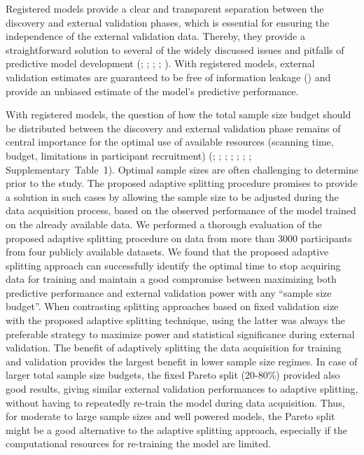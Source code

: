 \documentclass{article}
\begin{document}
Registered models provide a clear and transparent separation between the discovery and external validation phases, which is essential for ensuring the independence of the external validation data. Thereby, they provide a straightforward solution to several of the widely discussed issues and pitfalls of predictive model development (\cite{Efron_1983}; \cite{Sui_2020}; \cite{Varoquaux_2022}; \cite{Marek_2022}; \cite{Spisak_2023}). With registered models, external validation estimates are guaranteed to be free of information leakage (\cite{Kapoor_2023}) and provide an unbiased estimate of the model's predictive performance.

With registered models, the question of how the total sample size budget should be distributed between the discovery and external validation phase remains of central importance for the optimal use of available resources (scanning time, budget, limitations in participant recruitment) (\cite{Archer_2020}; \cite{Riley_2021}; \cite{Marek_2022}; \cite{Spisak_2023}; \cite{Rosenberg_2022}; \cite{Thirion_2023}; \cite{Makowski_2023}; Supplementary~Table~1). Optimal sample sizes are often challenging to determine prior to the study. The proposed adaptive splitting procedure promises to provide a solution in such cases by allowing the sample size to be adjusted during the data acquisition process, based on the observed performance of the model trained on the already available data.
We performed a thorough evaluation of the proposed adaptive splitting procedure on data from more than 3000 participants from four publicly available datasets. We found that the proposed adaptive splitting approach can successfully identify the optimal time to stop acquiring data for training and maintain a good compromise between maximizing both predictive performance and external validation power with any ``sample size budget''. When contrasting splitting approaches based on fixed validation size with the proposed adaptive splitting technique, using the latter was always the preferable strategy to maximize power and statistical significance during external validation. The benefit of adaptively splitting the data acquisition for training and validation provides the largest benefit in lower sample size regimes.
In case of larger total sample size budgets, the fixed Pareto split (20-80\%) provided also good results, giving similar external validation performances to adaptive splitting, without having to repeatedly re-train the model during data acquisition.
Thus, for moderate to large sample sizes and well powered models, the Pareto split might be a good alternative to the adaptive splitting approach, especially if the computational resources for re-training the model are limited.
\end{document}
